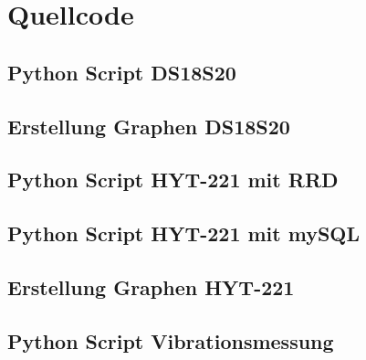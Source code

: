 \chapter{Quellcode}
\section{Python Script DS18S20}

\newpage


\section{Erstellung Graphen DS18S20}
\label{Erstellung Graphen DS18S20}

\newpage

\section{Python Script HYT-221 mit RRD}
\label{Python Script HYT-221 mit RDD}

\newpage

\section{Python Script HYT-221 mit mySQL}
\label{Python Script HYT-221 mit mySQL}

\newpage

\section{Erstellung Graphen HYT-221}
\label{Erstellung Graphen HYT-221}

\newpage

\section{Python Script Vibrationsmessung}
\label{Python Script Vibrationsmessung}

\newpage